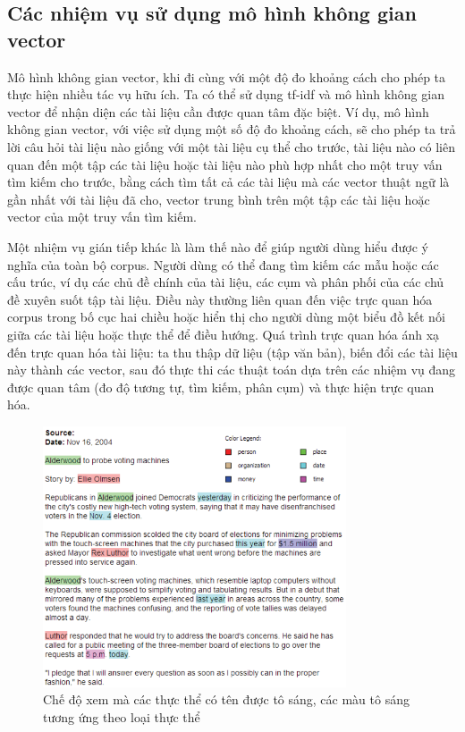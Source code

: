 \documentclass[14pt, a4paper]{article}
\numberwithin{equation}{section}
\numberwithin{figure}{section}
\numberwithin{dl}{section}
\numberwithin{md}{section}
\numberwithin{bd}{section}
\numberwithin{dn}{section}
\numberwithin{hq}{section}
\begin{document}
    \subsection{Các nhiệm vụ sử dụng mô hình không gian vector}

    Mô hình không gian vector, khi đi cùng với một độ đo khoảng cách cho phép ta thực hiện nhiều tác vụ hữu ích.
    Ta có thể sử dụng tf-idf và mô hình không gian vector để nhận diện các tài liệu cần được quan tâm đặc biệt.
    Ví dụ, mô hình không gian vector, với việc sử dụng một số độ đo khoảng cách, sẽ cho phép ta trả lời câu hỏi tài liệu nào giống với một tài liệu cụ thể cho trước,
    tài liệu nào có liên quan đến một tập các tài liệu hoặc tài liệu nào phù hợp nhất cho một truy vấn tìm kiếm cho trước,
    bằng cách tìm tất cả các tài liệu mà các vector thuật ngữ là gần nhất với tài liệu đã cho, vector trung bình trên một tập các tài liệu hoặc vector của một truy vấn tìm kiếm.

    Một nhiệm vụ gián tiếp khác là làm thế nào để giúp người dùng hiểu được ý nghĩa của toàn bộ corpus.
    Người dùng có thể đang tìm kiếm các mẫu hoặc các cấu trúc, ví dụ các chủ đề chính của tài liệu, các cụm và phân phối của các chủ đề xuyên suốt tập tài liệu.
    Điều này thường liên quan đến việc trực quan hóa corpus trong bố cục hai chiều hoặc hiển thị cho người dùng một biểu đồ kết nối giữa các tài liệu hoặc thực thể để điều hướng.
    Quá trình trực quan hóa ánh xạ đến trực quan hóa tài liệu: ta thu thập dữ liệu (tập văn bản),
    biến đổi các tài liệu này thành các vector, sau đó thực thi các thuật toán dựa trên các nhiệm vụ đang được quan tâm (đo độ tương tự, tìm kiếm, phân cụm) và thực hiện trực quan hóa.

    \begin{figure}[h!]
        \centering
        \includegraphics[width=0.8\textwidth]{3.png}
        \caption{Chế độ xem mà các thực thể có tên được tô sáng, các màu tô sáng tương ứng theo loại thực thể}
        \label{fig:3}
    \end{figure}
\end{document}
